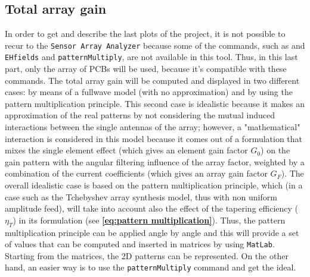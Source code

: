 \documentclass[12pt,a4paper]{article}
\begin{document}
{\begin{multicols}{2}
\subsection*{\selectfont\color{Turquoise}Total array gain}
In order to get and describe the last plots of the project, it is not possible to recur to the \texttt{\color{Mahogany}Sensor Array Analyzer} because some of the commands, such as  and \texttt{\color{Turquoise}EHfields} and \texttt{\color{Turquoise}patternMultiply}, are not available in this tool. Thus, in this last part, only the array of PCBs will be used, because it's compatible with these commands. The total array gain will be computed and displayed in two different cases: by means of a fullwave model (with no approximation) and by using the pattern multiplication principle. This second case is idealistic because it makes an approximation of the real patterns by not considering the mutual induced interactions between the single antennas of the array; however, a "mathematical" interaction is considered in this model because it comes out of a formulation that mixes the single element effect (which gives an element gain factor $G_0$) on the gain pattern with the angular filtering influence of the array factor, weighted by a combination of the current coefficients (which gives an array gain factor $G_F$). The overall idealistic case is based on the pattern multiplication principle, which (in a case such as the Tchebyshev array synthesis model, thus with non uniform amplitude feed), will take into account also the effect of the tapering efficiency ($\eta_T$) in its formulation (see \textbf{\cref{eq:pattern multiplication}}). Thus, the pattern multiplication principle can be applied angle by angle and this will provide a set of values that can be computed and inserted in matrices by using \texttt{\color{BurntOrange}MatLab}. Starting from the matrices, the 2D patterns can be represented. On the other hand, an easier way is to use the \texttt{\color{Turquoise}patternMultiply} command and get the ideal. 

\end{multicols}}
\end{document}
